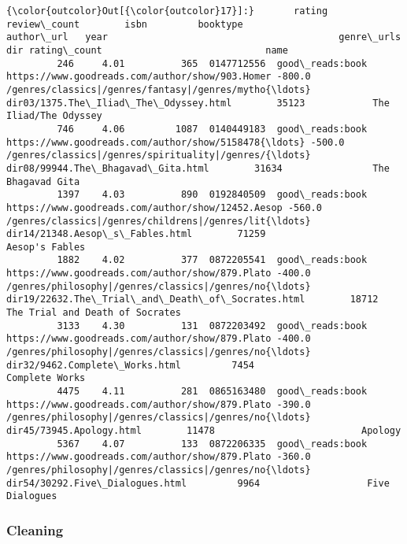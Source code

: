 \documentclass[11pt]{article}
\begin{document}
\begin{Verbatim}[commandchars=\\\{\}]
{\color{outcolor}Out[{\color{outcolor}17}]:}       rating review\_count        isbn         booktype                                         author\_url   year                                         genre\_urls                                               dir rating\_count                             name
         246     4.01          365  0147712556  good\_reads:book    https://www.goodreads.com/author/show/903.Homer -800.0  /genres/classics|/genres/fantasy|/genres/mytho{\ldots}             dir03/1375.The\_Iliad\_The\_Odyssey.html        35123            The Iliad/The Odyssey
         746     4.06         1087  0140449183  good\_reads:book  https://www.goodreads.com/author/show/5158478{\ldots} -500.0  /genres/classics|/genres/spirituality|/genres/{\ldots}                dir08/99944.The\_Bhagavad\_Gita.html        31634                The Bhagavad Gita
         1397    4.03          890  0192840509  good\_reads:book  https://www.goodreads.com/author/show/12452.Aesop -560.0  /genres/classics|/genres/childrens|/genres/lit{\ldots}                   dir14/21348.Aesop\_s\_Fables.html        71259                   Aesop's Fables
         1882    4.02          377  0872205541  good\_reads:book    https://www.goodreads.com/author/show/879.Plato -400.0  /genres/philosophy|/genres/classics|/genres/no{\ldots}  dir19/22632.The\_Trial\_and\_Death\_of\_Socrates.html        18712  The Trial and Death of Socrates
         3133    4.30          131  0872203492  good\_reads:book    https://www.goodreads.com/author/show/879.Plato -400.0  /genres/philosophy|/genres/classics|/genres/no{\ldots}                    dir32/9462.Complete\_Works.html         7454                   Complete Works
         4475    4.11          281  0865163480  good\_reads:book    https://www.goodreads.com/author/show/879.Plato -390.0  /genres/philosophy|/genres/classics|/genres/no{\ldots}                          dir45/73945.Apology.html        11478                          Apology
         5367    4.07          133  0872206335  good\_reads:book    https://www.goodreads.com/author/show/879.Plato -360.0  /genres/philosophy|/genres/classics|/genres/no{\ldots}                   dir54/30292.Five\_Dialogues.html         9964                   Five Dialogues
\end{Verbatim}
            
    \subsubsection{Cleaning}\label{cleaning}
\end{document}
